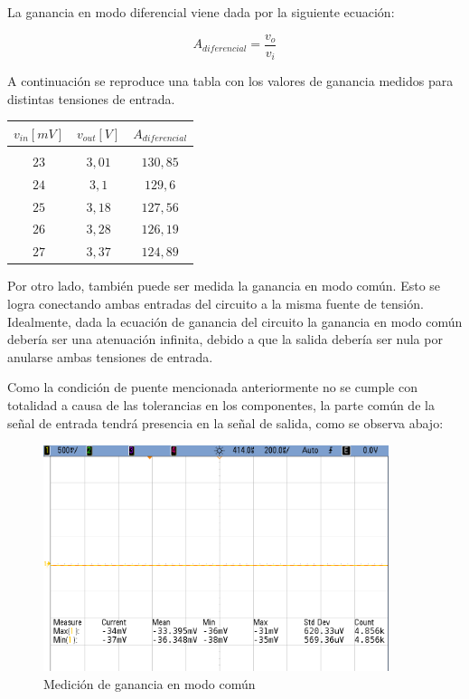 La ganancia en modo diferencial viene dada por la siguiente ecuaci\'on:

\begin{equation}
	A_{diferencial} = \frac{v_o}{v_i}
\end{equation}

A continuaci\'on se reproduce una tabla con los valores de ganancia medidos para distintas tensiones de entrada.

\begin{table}[H]
    \centering
    \begin{tabular}{c c c}
        $v_{in} [mV]$ & $v_{out} [V]$ & $A_{diferencial}$ \\
        \hline \\
        $23$ & $3,01$ & $130,85$ \\
        $24$ & $3,1$ & $129,6$ \\
        $25$ & $3,18$ & $127,56$ \\
        $26$ & $3,28$ & $126,19$ \\
        $27$ & $3,37$ & $124,89$ \\
        \hline
    \end{tabular}
\end{table}

Por otro lado, tambi\'en puede ser medida la ganancia en modo com\'un. Esto se logra conectando ambas entradas del circuito a la misma fuente de tensi\'on. Idealmente, dada la ecuaci\'on de ganancia del circuito la ganancia en modo com\'un deber\'ia ser una atenuaci\'on infinita, debido a que la salida deber\'ia ser nula por anularse ambas tensiones de entrada.

Como la condici\'on de puente mencionada anteriormente no se cumple con totalidad a causa de las tolerancias en los componentes, la parte com\'un de la se\~nal de entrada tendr\'a presencia en la se\~nal de salida, como se observa abajo:

\begin{figure}[H]
    \centering
    \includegraphics[width=0.9\textwidth]{../EJ4/resources/commode_med.png}
	\caption{Medici\'on de ganancia en modo com\'un}
   	\label{fig:EJ4_commodegain}
\end{figure}

